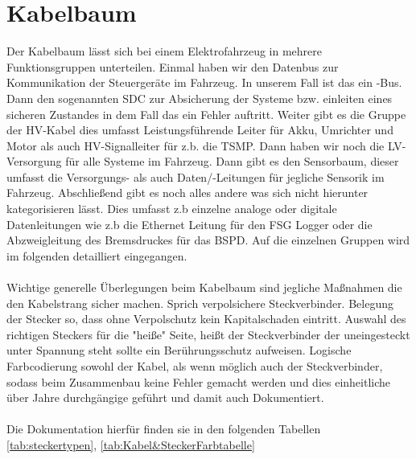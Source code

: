\section{Kabelbaum} %
Der Kabelbaum lässt sich bei einem Elektrofahrzeug in mehrere Funktionsgruppen unterteilen. Einmal haben wir den Datenbus zur Kommunikation der Steuergeräte im Fahrzeug. In unserem Fall ist das ein -Bus. Dann den sogenannten \ac{SDC} zur Absicherung der Systeme bzw. einleiten eines sicheren Zustandes in dem Fall das ein Fehler auftritt. Weiter gibt es die Gruppe der \ac{HV}-Kabel dies umfasst Leistungsführende Leiter für Akku, Umrichter und Motor als auch \ac{HV}-Signalleiter für z.b. die \ac{TSMP}. Dann haben wir noch die \ac{LV}-Versorgung für alle Systeme im Fahrzeug. Dann gibt es den Sensorbaum, dieser umfasst die Versorgungs- als auch Daten/-Leitungen für jegliche Sensorik im Fahrzeug. Abschließend gibt es noch alles andere was sich nicht hierunter kategorisieren lässt. Dies umfasst z.b einzelne analoge oder digitale Datenleitungen wie z.b die Ethernet Leitung für den \ac{FSG} Logger oder die Abzweigleitung des Bremsdruckes für das \ac{BSPD}. Auf die einzelnen Gruppen wird im folgenden detailliert eingegangen.\\
\\
Wichtige generelle Überlegungen beim Kabelbaum sind jegliche Maßnahmen die den Kabelstrang  sicher machen. Sprich verpolsichere Steckverbinder. Belegung der Stecker so, dass ohne Verpolschutz kein Kapitalschaden eintritt. Auswahl des richtigen Steckers für die "heiße" Seite, heißt der Steckverbinder der uneingesteckt unter Spannung steht sollte ein Berührungsschutz aufweisen. Logische Farbcodierung sowohl der Kabel, als wenn möglich auch der Steckverbinder, sodass beim Zusammenbau keine Fehler gemacht werden und dies einheitliche über Jahre durchgängige geführt und damit auch Dokumentiert.\\
\\
Die Dokumentation hierfür finden sie in den folgenden Tabellen \ref{tab:steckertypen}, \ref{tab:Kabel&SteckerFarbtabelle}


